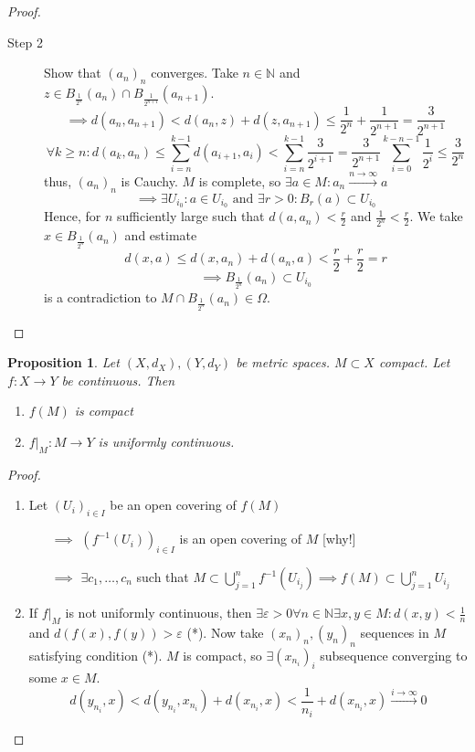 \documentclass[a4paper]{article}
\newcounter{lecref}[section]
\numberwithin{lecref}{section}
\newtheorem{proposition}[lecref]{Proposition}
\begin{document}
\begin{proof}
\begin{description}
\begin{description}
				\item[Step 2] Show that $(a_n)_n$ converges. Take $n \in \mathbb N$ and $z \in B_{\frac{1}{2^n}}(a_n) \cap B_{\frac{1}{2^{n+1}}}(a_{n+1})$.
					\[ \implies d(a_n, a_{n+1}) < d(a_n, z) + d(z, a_{n+1}) \leq \frac{1}{2^n} + \frac{1}{2^{n+1}} = \frac{3}{2^{n+1}} \]
					\[ \forall k \geq n: d(a_k, a_n) \leq \sum_{i=n}^{k-1} d(a_{i+1}, a_i) < \sum_{i=n}^{k-1} \frac{3}{2^{i+1}} = \frac{3}{2^{n+1}} \sum_{i=0}^{k-n-1} \frac{1}{2^i} \leq \frac{3}{2^n} \]
					thus, $(a_n)_n$ is Cauchy. $M$ is complete, so $\exists a \in M: a_n \xrightarrow{n \to \infty} a$
					\[ \implies \exists U_{i_0}: a \in U_{i_0} \text{ and } \exists r > 0: B_r(a) \subset U_{i_0} \]
					Hence, for $n$ sufficiently large such that $d(a, a_n) < \frac r2$ and $\frac1{2^n} < \frac r2$.
					We take $x \in B_{\frac1{2^n}}(a_n)$ and estimate
					\[ d(x, a) \leq d(x, a_n) + d(a_n, a) < \frac r2 + \frac r2 = r \]
					\[ \implies B_{\frac{1}{2^n}}(a_n) \subset U_{i_0} \]
					is a contradiction to $M \cap B_{\frac1{2^n}}(a_n) \in \Omega$.
			\end{description}
	\end{description}
\end{proof}

\begin{proposition}
	\label{proposition:1.20}
	Let $(X, d_X), (Y, d_Y)$ be metric spaces. $M \subset X$ compact. Let $f: X \to Y$ be continuous. Then
	\begin{enumerate}
		\item $f(M)$ is compact
		\item $f|_M: M \to Y$ is uniformly continuous.
	\end{enumerate}
\end{proposition}

\begin{proof}
	\begin{enumerate}
		\item Let $(U_i)_{i \in I}$ be an open covering of $f(M)$
			\begin{enumerate}
				\item[$\implies$] $(f^{-1}(U_i))_{i \in I}$ is an open covering of $M$ [why!]
				\item[$\implies$] $\exists c_1, \dots, c_n$ such that $M \subset \bigcup_{j=1}^n f^{-1}(U_{i_j}) \implies f(M) \subset \bigcup_{j=1}^n U_{i_j}$
			\end{enumerate}
		\item If $f|_M$ is not uniformly continuous, then $\exists \varepsilon > 0 \forall n \in \mathbb N \exists x, y \in M: d(x, y) < \frac1n$ and $d(f(x), f(y)) > \varepsilon$ (*).
			Now take $(x_n)_n, (y_n)_n$ sequences in $M$ satisfying condition (*).
			$M$ is compact, so $\exists (x_{n_i})_{i}$ subsequence converging to some $x \in M$.
			\[ d(y_{n_i}, x) < d(y_{n_i}, x_{n_i}) + d(x_{n_i}, x) < \frac{1}{n_i} + d(x_{n_i}, x) \xrightarrow{i \to \infty} 0 \]
	\end{enumerate}
\end{proof}
\end{document}
